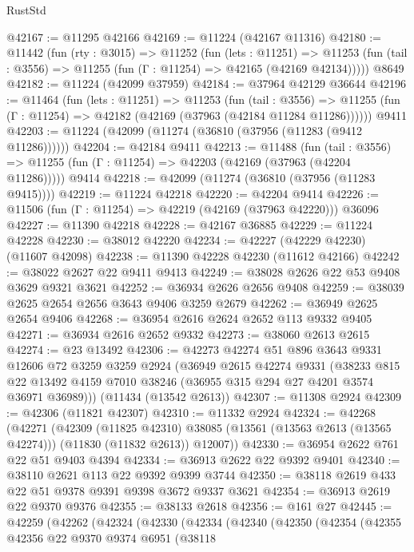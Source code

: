 \begin{lexlean}{RustStd}
\begin{coremodule}
@42167 := @11295 @42166
@42169 := @11224 (@42167 @11316)
@42180 := @11442
    (fun (rty : @3015) =>
    @11252
      (fun (lets : @11251) =>
      @11253 (fun (tail : @3556) => @11255 (fun (Γ : @11254) => @42165 (@42169 @42134)))))
    @8649
@42182 := @11224 (@42099 @37959)
@42184 := @37964 @42129 @36644
@42196 := @11464
    (fun (lets : @11251) =>
    @11253
      (fun (tail : @3556) =>
      @11255 (fun (Γ : @11254) => @42182 (@42169 (@37963 (@42184 @11284 @11286))))))
    @9411
@42203 := @11224 (@42099 (@11274 (@36810 (@37956 (@11283 (@9412 @11286))))))
@42204 := @42184 @9411
@42213 := @11488
    (fun (tail : @3556) => @11255 (fun (Γ : @11254) => @42203 (@42169 (@37963 (@42204 @11286)))))
    @9414
@42218 := @42099 (@11274 (@36810 (@37956 (@11283 @9415))))
@42219 := @11224 @42218
@42220 := @42204 @9414
@42226 := @11506 (fun (Γ : @11254) => @42219 (@42169 (@37963 @42220))) @36096
@42227 := @11390 @42218
@42228 := @42167 @36885
@42229 := @11224 @42228
@42230 := @38012 @42220
@42234 := @42227 (@42229 @42230) (@11607 @42098)
@42238 := @11390 @42228 @42230 (@11612 @42166)
@42242 := @38022 @2627 @22 @9411 @9413
@42249 := @38028 @2626 @22 @53 @9408 @3629 @9321 @3621
@42252 := @36934 @2626 @2656 @9408
@42259 := @38039 @2625 @2654 @2656 @3643 @9406 @3259 @2679
@42262 := @36949 @2625 @2654 @9406
@42268 := @36954 @2616 @2624 @2652 @113 @9332 @9405
@42271 := @36934 @2616 @2652 @9332
@42273 := @38060 @2613 @2615
@42274 := @23 @13492
@42306 := @42273
    @42274
    @51
    @896
    @3643
    @9331
    @12606
    @72
    @3259
    @3259
    @2924
    (@36949
      @2615
      @42274
      @9331
      (@38233 @815 @22 @13492 @4159 @7010 @38246 (@36955 @315 @294 @27 @4201 @3574 @36971 @36989)))
    (@11434 (@13542 @2613))
@42307 := @11308 @2924
@42309 := @42306 (@11821 @42307)
@42310 := @11332 @2924
@42324 := @42268
    (@42271
      (@42309
        (@11825 @42310)
        @38085
        (@13561 (@13563 @2613 (@13565 @42274)))
        (@11830 (@11832 @2613))
        @12007))
@42330 := @36954 @2622 @761 @22 @51 @9403 @4394
@42334 := @36913 @2622 @22 @9392 @9401
@42340 := @38110 @2621 @113 @22 @9392 @9399 @3744
@42350 := @38118 @2619 @433 @22 @51 @9378 @9391 @9398 @3672 @9337 @3621
@42354 := @36913 @2619 @22 @9370 @9376
@42355 := @38133 @2618
@42356 := @161 @27
@42445 := @42259
    (@42262
      (@42324
        (@42330
          (@42334
            (@42340
              (@42350
                (@42354
                  (@42355
                    @42356
                    @22
                    @9370
                    @9374
                    @6951
                    (@38118

\end{coremodule}
\end{lexlean}
